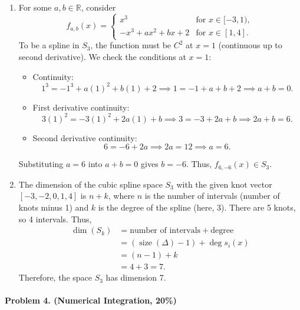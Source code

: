 \begin{enumerate}[label=(\alph*)]
    \item For some \( a, b \in \mathbb{R} \), consider
          \[
              f_{a,b}(x) =
              \begin{cases}
                  x^3                    & \text{for } x \in [-3, 1), \\
                  -x^3 + a x^2 + b x + 2 & \text{for } x \in [1, 4].
              \end{cases}
          \]
          To be a spline in \( S_3 \), the function must be \( C^2 \) at \( x = 1 \) (continuous up to second derivative).
          We check the conditions at \( x = 1 \):
          \begin{itemize}
              \item Continuity:
                    \[
                        1^3 = -1^3 + a(1)^2 + b(1) + 2 \implies 1 = -1 + a + b + 2 \implies a + b = 0.
                    \]
              \item First derivative continuity:
                    \[
                        3(1)^2 = -3(1)^2 + 2a(1) + b \implies 3 = -3 + 2a + b \implies 2a + b = 6.
                    \]
              \item Second derivative continuity:
                    \[
                        6 = -6 + 2a \implies 2a = 12 \implies a = 6.
                    \]
          \end{itemize}
          Substituting \( a = 6 \) into \( a + b = 0 \) gives \( b = -6 \). Thus, \( f_{6,-6}(x) \in S_3 \).
    \item The dimension of the cubic spline space \( S_3 \) with the given knot vector \([-3, -2, 0, 1, 4]\) is \( n + k \), where \( n \) is the number of intervals (number of knots minus 1) and \( k \) is the degree of the spline (here, 3). There are 5 knots, so 4 intervals. Thus,
          \begin{align*}
              \dim(S_k) & = \text{number of intervals} + \text{degree}                  \\
                        & = \left(\operatorname{size}(\Delta) - 1\right) +  \deg s_i(x) \\
                        & = (n-1) + k                                                   \\
                        & = 4 + 3 = 7.
          \end{align*}
          Therefore, the space \( S_3 \) has dimension 7.
\end{enumerate}

\paragraph{Problem 4. (Numerical Integration, 20\%)}

